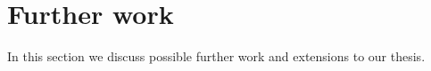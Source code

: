 \section{Further work}

In this section we discuss possible further work and extensions to our thesis.





